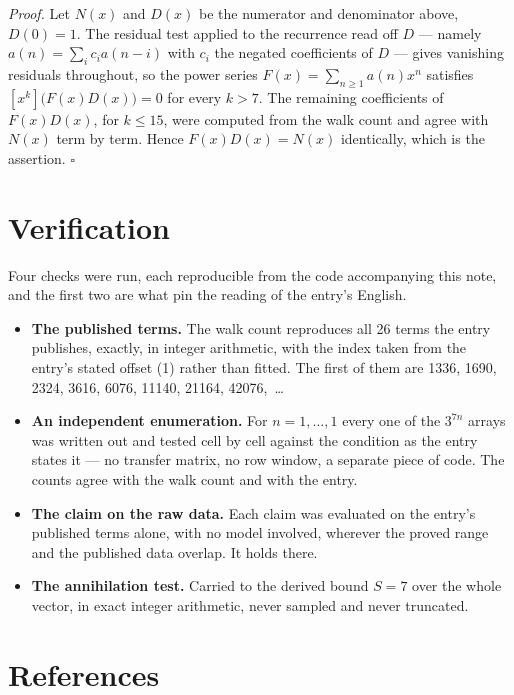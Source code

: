 \documentclass[11pt]{article}
\theoremstyle{definition}
\begin{document}
{\itshape Proof.} Let $N(x)$ and $D(x)$ be the numerator and denominator above, $D(0)=1$. The residual test applied to the recurrence read off $D$ --- namely $a(n) = \sum_i c_i a(n-i)$ with $c_i$ the negated coefficients of $D$ --- gives vanishing residuals throughout, so the power series $F(x)=\sum_{n\ge 1}a(n)x^n$ satisfies $[x^k]\bigl(F(x)D(x)\bigr) = 0$ for every $k > 7$. The remaining coefficients of $F(x)D(x)$, for $k \le 15$, were computed from the walk count and agree with $N(x)$ term by term. Hence $F(x)D(x) = N(x)$ identically, which is the assertion. $\square$

\section{Verification}

Four checks were run, each reproducible from the code accompanying this note, and the first two are what pin the reading of the entry's English.

\begin{itemize}

\item {\bfseries The published terms.} The walk count reproduces all 26 terms the entry publishes, exactly, in integer arithmetic, with the index taken from the entry's stated offset (1) rather than fitted. The first of them are 1336, 1690, 2324, 3616, 6076, 11140, 21164, 42076,~\dots

\item {\bfseries An independent enumeration.} For $n = 1,\dots,1$ every one of the $3^{7n}$ arrays was written out and tested cell by cell against the condition as the entry states it --- no transfer matrix, no row window, a separate piece of code. The counts agree with the walk count and with the entry.

\item {\bfseries The claim on the raw data.} Each claim was evaluated on the entry's published terms alone, with no model involved, wherever the proved range and the published data overlap. It holds there.

\item {\bfseries The annihilation test.} Carried to the derived bound $S = 7$ over the whole vector, in exact integer arithmetic, never sampled and never truncated.

\end{itemize}

\section{References}
\end{document}
